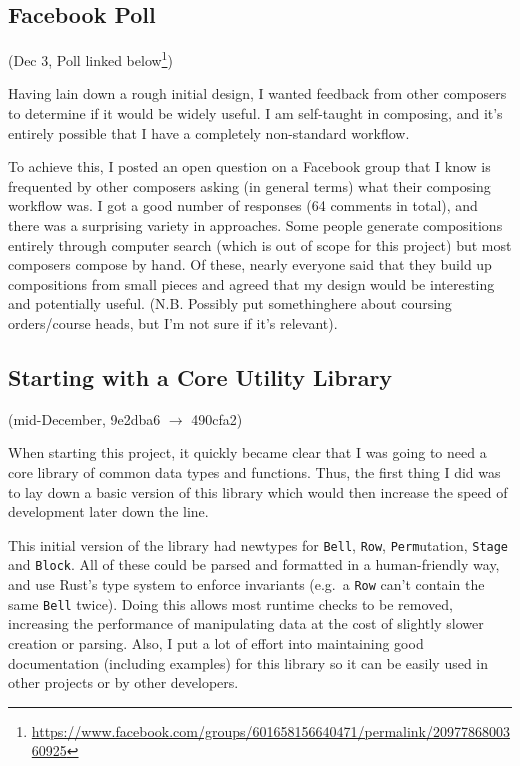 \documentclass[12pt]{article}
\newcommand{\footurl}[1]{\footnote{\url{#1}}}
\begin{document}
\subsection{Facebook Poll}

(Dec 3, Poll linked
below\footurl{https://www.facebook.com/groups/601658156640471/permalink/2097786800360925})

Having lain down a rough initial design, I wanted feedback from other composers to determine if it
would be widely useful.  I am self-taught in composing, and it's entirely possible that I have a
completely non-standard workflow.

To achieve this, I posted an open question on a Facebook group that I know is frequented by other
composers asking (in general terms) what their composing workflow was.  I got a good number of
responses (64 comments in total), and there was a surprising variety in approaches.  Some people
generate compositions entirely through computer search (which is out of scope for this project) but
most composers compose by hand.  Of these, nearly everyone said that they build up compositions from
small pieces and agreed that my design would be interesting and potentially useful.  (N.B. Possibly
put somethinghere about coursing orders/course heads, but I'm not sure if it's relevant).

\subsection{Starting with a Core Utility Library}

(mid-December, 9e2dba6 $\to$ 490cfa2)

When starting this project, it quickly became clear that I was going to need a core library of
common data types and functions.  Thus, the first thing I did was to lay down a basic version of
this library which would then increase the speed of development later down the line.

This initial version of the library had newtypes for \verb|Bell|, \verb|Row|, \verb|Perm|utation,
\verb|Stage| and \verb|Block|.  All of these could be parsed and formatted in a human-friendly way,
and use Rust's type system to enforce invariants (e.g.\ a \verb|Row| can't contain the same
\verb|Bell| twice).  Doing this allows most runtime checks to be removed, increasing the performance
of manipulating data at the cost of slightly slower creation or parsing.  Also, I put a lot of
effort into maintaining good documentation (including examples) for this library so it can be easily
used in other projects or by other developers.
\end{document}
